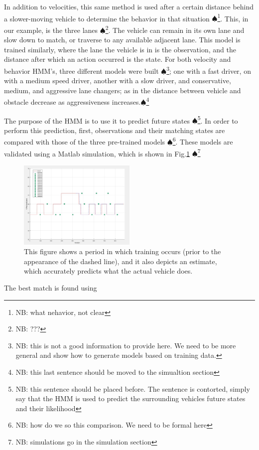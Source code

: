 \documentclass[conference]{IEEEtran}
\newcommand\NB[1]{$\spadesuit$\footnote{NB: #1}}
\begin{document}
In addition to velocities, this same method is used after a certain distance behind a slower-moving vehicle to determine the behavior in that situation \NB{what nehavior, not clear}. This, in our example, is the three lanes \NB{???}. The vehicle can remain in its own lane and slow down to match, or traverse to any available adjacent lane. This model is trained similarly, where the lane the vehicle is in is the observation, and the distance after which an action occurred is the state. For both velocity and behavior HMM's, three different models were built \NB{this is not a good information to provide here. We need to be more general and show how to generate models based on training data.}; one with a fast driver, on with a medium speed driver, another with a slow driver, and conservative, medium, and aggressive lane changers; as in the distance between vehicle and obstacle decrease as aggressiveness increases.\NB{this last sentence should be moved to the simualtion section}

The purpose of the HMM is to use it to predict future states \NB{this sentence should be placed before. The sentence is contorted, simply say that the HMM is used to predict the surrounding vehicles future states and their likelihood}. In order to perform this prediction, first, observations and their matching states are compared with those of the three pre-trained models \NB{how do we so this comparison. We need to be formal here}. These models are validated using a Matlab simulation, which is shown in Fig.\ref{fig:trainset} \NB{simulations go in the simulation section}

\begin{figure}[ht]
    \includegraphics[width=0.5\textwidth]{trainset.JPG}
    \caption{This figure shows a period in which training occurs (prior to the appearance of the dashed line), and it also depicts an estimate, which accurately predicts what the actual vehicle does.}
    \label{fig:trainset}
\end{figure}


The best match is found using
\end{document}
